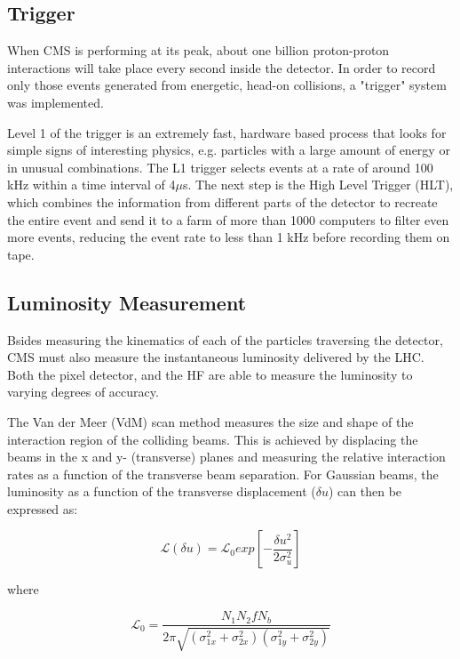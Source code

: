  \subsection{Trigger}
 When CMS is performing at its peak, about one billion proton-proton interactions will take place every second inside the detector. In order to record only those events generated from energetic, head-on collisions, a "trigger" system was implemented.

Level 1 of the trigger is an extremely fast, hardware based process that looks for simple signs of interesting physics, e.g. particles with a large amount of energy or in unusual combinations. The L1 trigger selects events at a rate of around 100 kHz within a time interval of 4$\mu$s. The next step is the High Level Trigger (HLT), which combines the information from different parts of the detector to recreate the entire event and send it to a farm of more than 1000 computers to filter even more events, reducing the event rate to less than 1 kHz before recording them on tape.

\subsection{Luminosity Measurement}

Bsides measuring the kinematics of each of the particles traversing the detector, CMS must also measure the instantaneous luminosity delivered by the LHC. Both the pixel detector, and the HF are able to measure the luminosity to varying degrees of accuracy.

The Van der Meer (VdM) scan method measures the size and shape of the interaction region of the colliding beams. This is achieved by displacing the beams in the x and y- (transverse) planes and measuring the relative interaction rates as a function of the transverse beam separation. For Gaussian beams, the luminosity as a function of the transverse displacement ($\delta u$) can then be expressed as:  

\begin{equation}
\mathcal{L}(\delta u) = \mathcal{L}_{0} exp[-\frac{\delta u^{2}}{2\sigma_{u}^{2}}]
\end{equation}

where 

\begin{equation}
\mathcal{L}_{0} = \frac{N_{1}N_{2}fN_{b}}{2\pi\sqrt{(\sigma_{1x}^{2}+\sigma_{2x}^{2})(\sigma_{1y}^{2}+\sigma_{2y}^{2})}}
\end{equation}

